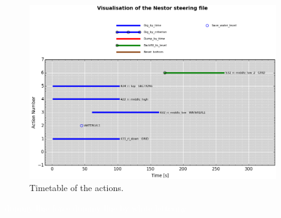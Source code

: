 \begin{figure} [H]
 \centering
 \includegraphics[width=0.95\textwidth]{img/TimeTableActions.png}
 \caption{Timetable of the actions.}
 \label{TiTa}
\end{figure}

\textcolor{white}{dummy line force dummy line by white lettering} %
\\
\\
